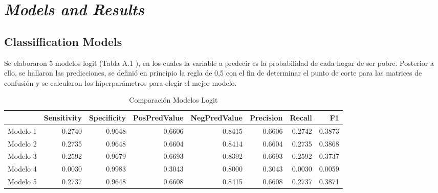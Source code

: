 \documentclass[11pt]{article}
\begin{document}
\section{\bf\emph {Models and Results}}\label{sec:sec3}

\subsection{Classiffication Models}

\justify 
 Se elaboraron 5 modelos logit (Tabla A.1 ), en los cuales la variable a predecir es la probabilidad de cada hogar de ser pobre. Posterior a ello, se hallaron las predicciones, se definió en principio la regla de 0,5 con el fin de determinar el punto de corte para las matrices de confusión y se calcularon los hiperparámetros para elegir el mejor modelo. 
\begin{table}[ht]
\centering
\caption{Comparación Modelos Logit}
\begin{tabular}{rrrrrrrr}
 \hline
 & Sensitivity & Specificity & PosPredValue & NegPredValue & Precision & Recall & F1 \\ 
  \hline
Modelo 1 & 0.2740 & 0.9648 & 0.6606 & 0.8415 & 0.6606 & 0.2742 & {\color{red}0.3873} \\ 
  Modelo 2 & 0.2735 & 0.9648 & 0.6604 & 0.8414 & 0.6604 & 0.2735 & 0.3868 \\ 
  Modelo 3 & 0.2592 & 0.9679 & 0.6693 & 0.8392 & 0.6693 & 0.2592 & 0.3737 \\ 
  Modelo 4 & 0.0030 & 0.9983 & 0.3043 & 0.8000 & 0.3043 & 0.0030 & 0.0059 \\ 
  Modelo 5 & 0.2737 & 0.9648 & 0.6608 & 0.8415 & 0.6608 & 0.2737 & 0.3871 \\ 
   \hline
\end{tabular}
\end{table}
\end{document}

